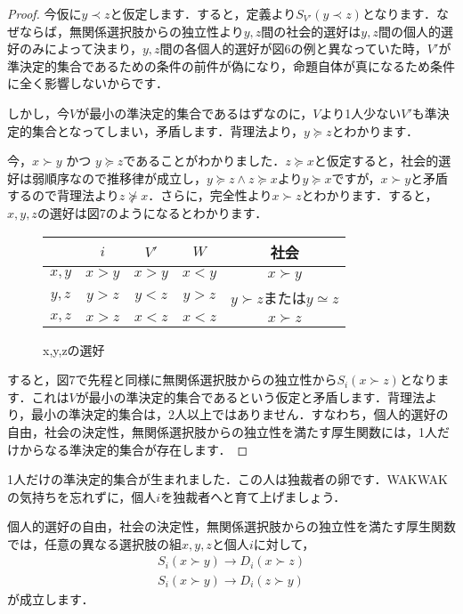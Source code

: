 \begin{proof}
今仮に$y \prec z$と仮定します．すると，定義より$S_{V'}(y \prec z)$となります．なぜならば，無関係選択肢からの独立性より$y,z$間の社会的選好は$y,z$間の個人的選好のみによって決まり，$y,z$間の各個人的選好が図6の例と異なっていた時，$V'$が準決定的集合であるための条件の前件が偽になり，命題自体が真になるため条件に全く影響しないからです．

しかし，今$V$が最小の準決定的集合であるはずなのに，$V$より1人少ない$V'$も準決定的集合となってしまい，矛盾します．背理法より，$y \succeq z$とわかります．

今，$x \succ y$ かつ $ y \succeq z$であることがわかりました．$z \succeq x$と仮定すると，社会的選好は弱順序なので推移律が成立し，$y \succeq z \land z \succeq x$より$y \succeq x$ですが，$x \succ y$と矛盾するので背理法より$z \not \succeq x$．さらに，完全性より$x \succ z$とわかります．すると，$x,y,z$の選好は図7のようになるとわかります．

\begin{figure}[!h]
    \centering
    \begin{tabular}{|c|c|c|c|c|} \hline
        & $i$ & $V'$ & $W$ & 社会 \\ \hline
        $x,y$ & $x > y$ & $x > y$ & $x < y$ & $x \succ y$ \\ \hline
        $y,z$ & $y > z$ & $y < z$ & $y > z$ & $y \succ z$または$y \simeq z$ \\ \hline
        $x,z$ & $x > z$ & $x < z$ & $x < z$ & $x \succ z$ \\ \hline
    \end{tabular}
    \caption{x,y,zの選好}
\end{figure}

すると，図7で先程と同様に無関係選択肢からの独立性から$S_i(x \succ z)$となります．これは$V$が最小の準決定的集合であるという仮定と矛盾します．背理法より，最小の準決定的集合は，2人以上ではありません．すなわち，個人的選好の自由，社会の決定性，無関係選択肢からの独立性を満たす厚生関数には，1人だけからなる準決定的集合が存在します．
\end{proof}

1人だけの準決定的集合が生まれました．この人は独裁者の卵です．WAKWAKの気持ちを忘れずに，個人$i$を独裁者へと育て上げましょう．

\begin{lem}\label{lem:43}
    個人的選好の自由，社会の決定性，無関係選択肢からの独立性を満たす厚生関数では，任意の異なる選択肢の組$x,y,z$と個人$i$に対して，
    \begin{align*}
        S_i(x \succ y) \to D_i(x \succ z) \\
        S_i(x \succ y) \to D_i(z \succ y)
    \end{align*}
    が成立します．
\end{lem}

